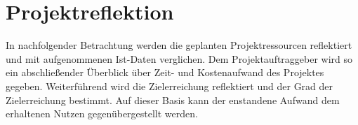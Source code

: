 \section{Projektreflektion}
\label{sec:Projektreflektion}

In nachfolgender Betrachtung werden die geplanten Projektressourcen reflektiert
und mit aufgenommenen Ist-Daten verglichen. Dem Projektauftraggeber wird so
ein abschließender Überblick über Zeit- und Kostenaufwand des
Projektes gegeben. Weiterführend wird die Zielerreichung reflektiert und der
Grad der Zielerreichung bestimmt. Auf dieser Basis kann der enstandene Aufwand
dem erhaltenen Nutzen gegenübergestellt werden.




